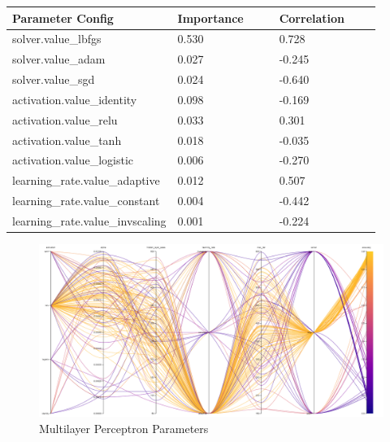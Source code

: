 \documentclass[11pt]{article}
\begin{document}
  
  \begin{table}[ht]
    \centering
    \begin{tabular}{|p{0.3\linewidth} | p{0.3\linewidth}| p{0.3\linewidth}|} 
      \hline
      \textbf{Parameter Config}  & \textbf{Importance} & \textbf{Correlation} \\ \hline
        solver.value\_lbfgs & 0.530 & 0.728 \\ \hline
        solver.value\_adam & 0.027 & -0.245 \\ \hline
        solver.value\_sgd & 0.024 & -0.640 \\ \hline
        activation.value\_identity & 0.098 & -0.169 \\ \hline
        activation.value\_relu & 0.033 & 0.301 \\ \hline
        activation.value\_tanh & 0.018 & -0.035 \\ \hline
        activation.value\_logistic & 0.006 & -0.270 \\ \hline
        learning\_rate.value\_adaptive & 0.012 & 0.507 \\ \hline
        learning\_rate.value\_constant & 0.004 & -0.442 \\ \hline
        learning\_rate.value\_invscaling & 0.001 & -0.224 \\ \hline
    \end{tabular}
  \end{table}\label{MLP_ParamImp2}

\begin{figure}[h]
  \caption {Multilayer Perceptron Parameters} \label{ParallelCoordMLP}
  \centering 
  \includegraphics[width = \textwidth, height = \textwidth, keepaspectratio]{Images/MLP ParallelCoordGraph.png}
\end{figure}
\FloatBarrier
\end{document}

